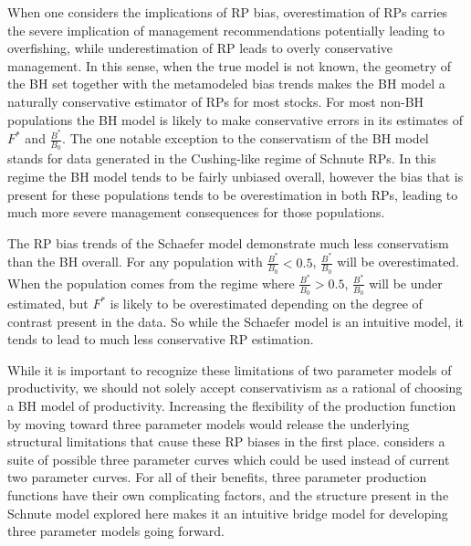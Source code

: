%
When one considers the implications of RP bias, overestimation of RPs carries 
the severe implication of management recommendations potentially leading to 
overfishing, while underestimation of RP leads to overly conservative management.
In this sense, when the true model is not known, the geometry of the BH set together 
with the metamodeled bias trends makes the BH model a naturally conservative 
estimator of RPs for most stocks. For most non-BH populations the BH model is 
likely to make conservative errors in its estimates of $F^*$ and $\frac{B^*}{B_0}$. 
The one notable exception to the conservatism of the BH model stands for data 
generated in the Cushing-like regime of Schnute RPs. In this regime the BH 
model tends to be fairly unbiased overall, however the bias that is present 
for these populations tends to be overestimation in both RPs, leading to much 
more severe management consequences for those populations.

%
The RP bias trends of the Schaefer model demonstrate much less conservatism than the BH overall.
For any population with $\frac{B^*}{B_0}<0.5$, $\frac{B^*}{B_0}$ will be overestimated. 
When the population comes from the regime where $\frac{B^*}{B_0}>0.5$, $\frac{B^*}{B_0}$ 
will be under estimated, but $F^*$ is likely to be overestimated depending on the degree of 
contrast present in the data. So while the Schaefer model is an intuitive model, it tends to 
lead to much less conservative RP estimation. 

%
While it is important to recognize these limitations of two parameter models 
of productivity, we should not solely accept conservativism as a rational of 
choosing a BH model of productivity. %
Increasing the flexibility of the production function by moving toward 
three parameter models would release the underlying structural limitations 
 that cause these RP biases in the first place. 
considers a suite of possible three parameter curves which could be used 
instead of current two parameter curves. For all of their benefits, three 
parameter production functions have their own complicating factors, and the 
structure present in the Schnute model explored here makes it an intuitive bridge 
model for developing three parameter models going forward.



